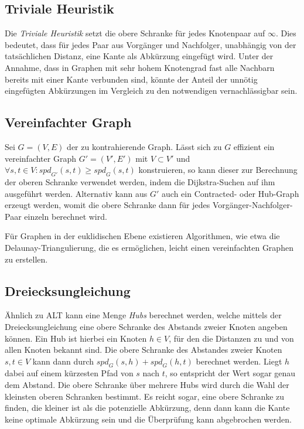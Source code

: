 \subsection{Triviale Heuristik}

Die \emph{Triviale Heuristik} setzt die obere Schranke für jedes Knotenpaar auf $\infty$.
Dies bedeutet, dass für jedes Paar aus Vorgänger und Nachfolger, unabhängig von der tatsächlichen Distanz, eine Kante als Abkürzung eingefügt wird.
Unter der Annahme, dass in Graphen mit sehr hohem Knotengrad fast alle Nachbarn bereits mit einer Kante verbunden sind, könnte der Anteil der unnötig eingefügten Abkürzungen im Vergleich zu den notwendigen vernachlässigbar sein.

\subsection{Vereinfachter Graph}

Sei $G = (V, E)$ der zu kontrahierende Graph.
Lässt sich zu $G$ effizient ein vereinfachter Graph $G' = (V', E')$ mit $V \subset V'$ und $\forall s, t \in V \colon {spd}_{G'} (s, t) \geq {spd}_{G} (s, t)$ konstruieren, so kann dieser zur Berechnung der oberen Schranke verwendet werden, indem die Dijkstra-Suchen auf ihm ausgeführt werden.
Alternativ kann aus $G'$ auch ein Contracted- oder Hub-Graph erzeugt werden, womit die obere Schranke dann für jedes Vorgänger-Nachfolger-Paar einzeln berechnet wird.

Für Graphen in der euklidischen Ebene existieren Algorithmen, wie etwa die Delaunay-Triangulierung, die es ermöglichen, leicht einen vereinfachten Graphen zu erstellen.

\subsection{Dreiecksungleichung}

Ähnlich zu ALT\cite{goldberg2005computing} kann eine Menge \emph{Hubs} berechnet werden, welche mittels der Dreiecksungleichung eine obere Schranke des Abstands zweier Knoten angeben können.
Ein Hub ist hierbei ein Knoten $h \in V$, für den die Distanzen zu und von allen Knoten bekannt sind.
Die obere Schranke des Abstandes zweier Knoten $s, t \in V$ kann dann durch ${spd}_G (s, h) + {spd}_G (h, t)$ berechnet werden.
Liegt $h$ dabei auf einem kürzesten Pfad von $s$ nach $t$, so entspricht der Wert sogar genau dem Abstand.
Die obere Schranke über mehrere Hubs wird durch die Wahl der kleinsten oberen Schranken bestimmt.
Es reicht sogar, eine obere Schranke zu finden, die kleiner ist als die potenzielle Abkürzung, denn dann kann die Kante keine optimale Abkürzung sein und die Überprüfung kann abgebrochen werden.

